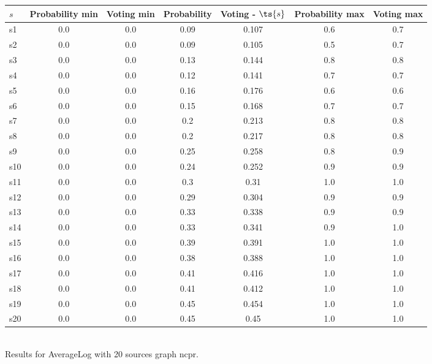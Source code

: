 \documentclass{article}
\begin{document}
\noindent\begin{tabular}{|l|c|c|c|c|c|c|}
\hline
$s$& Probability min & Voting min & Probability & Voting - $\ts{s}$ & Probability max & Voting max\\
\hline
s1 &0.0 & 0.0 & 0.09 & 0.107 & 0.6 & 0.7\\
\hline
s2 &0.0 & 0.0 & 0.09 & 0.105 & 0.5 & 0.7\\
\hline
s3 &0.0 & 0.0 & 0.13 & 0.144 & 0.8 & 0.8\\
\hline
s4 &0.0 & 0.0 & 0.12 & 0.141 & 0.7 & 0.7\\
\hline
s5 &0.0 & 0.0 & 0.16 & 0.176 & 0.6 & 0.6\\
\hline
s6 &0.0 & 0.0 & 0.15 & 0.168 & 0.7 & 0.7\\
\hline
s7 &0.0 & 0.0 & 0.2 & 0.213 & 0.8 & 0.8\\
\hline
s8 &0.0 & 0.0 & 0.2 & 0.217 & 0.8 & 0.8\\
\hline
s9 &0.0 & 0.0 & 0.25 & 0.258 & 0.8 & 0.9\\
\hline
s10 &0.0 & 0.0 & 0.24 & 0.252 & 0.9 & 0.9\\
\hline
s11 &0.0 & 0.0 & 0.3 & 0.31 & 1.0 & 1.0\\
\hline
s12 &0.0 & 0.0 & 0.29 & 0.304 & 0.9 & 0.9\\
\hline
s13 &0.0 & 0.0 & 0.33 & 0.338 & 0.9 & 0.9\\
\hline
s14 &0.0 & 0.0 & 0.33 & 0.341 & 0.9 & 1.0\\
\hline
s15 &0.0 & 0.0 & 0.39 & 0.391 & 1.0 & 1.0\\
\hline
s16 &0.0 & 0.0 & 0.38 & 0.388 & 1.0 & 1.0\\
\hline
s17 &0.0 & 0.0 & 0.41 & 0.416 & 1.0 & 1.0\\
\hline
s18 &0.0 & 0.0 & 0.41 & 0.412 & 1.0 & 1.0\\
\hline
s19 &0.0 & 0.0 & 0.45 & 0.454 & 1.0 & 1.0\\
\hline
s20 &0.0 & 0.0 & 0.45 & 0.45 & 1.0 & 1.0\\
\hline
\end{tabular}\\

\noindent Results for AverageLog with 20 sources graph ncpr.
\end{document}
